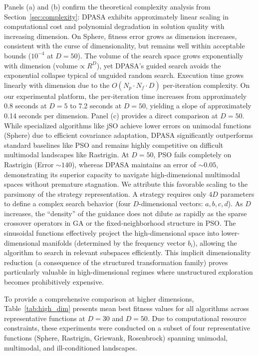 \documentclass[11pt]{article}
\begin{document}
Panels (a) and (b) confirm the theoretical complexity analysis from Section~\ref{sec:complexity}: DPASA exhibits approximately linear scaling in computational cost and polynomial degradation in solution quality with increasing dimension. On Sphere, fitness error grows as dimension increases, consistent with the curse of dimensionality, but remains well within acceptable bounds ($10^{-4}$ at $D=50$). The volume of the search space grows exponentially with dimension ($\text{volume} \propto R^D$), yet DPASA's guided search avoids the exponential collapse typical of unguided random search.
Execution time grows linearly with dimension due to the $O(N_p \cdot N_f \cdot D)$ per-iteration complexity. On our experimental platform, the per-iteration time increases from approximately 0.8 seconds at $D=5$ to 7.2 seconds at $D=50$, yielding a slope of approximately 0.14 seconds per dimension.
Panel (c) provides a direct comparison at $D=50$. While specialized algorithms like jSO achieve lower errors on unimodal functions (Sphere) due to efficient covariance adaptation, DPASA significantly outperforms standard baselines like PSO and remains highly competitive on difficult multimodal landscapes like Rastrigin. At $D=50$, PSO fails completely on Rastrigin (Error $\sim 140$), whereas DPASA maintains an error of $\sim 0.05$, demonstrating its superior capacity to navigate high-dimensional multimodal spaces without premature stagnation.
We attribute this favorable scaling to the parsimony of the strategy representation. A strategy requires only $4D$ parameters to define a complex search behavior (four $D$-dimensional vectors: $a, b, c, d$). As $D$ increases, the ``density'' of the guidance does not dilute as rapidly as the sparse crossover operators in GA or the fixed-neighborhood structure in PSO. The sinusoidal functions effectively project the high-dimensional space into lower-dimensional manifolds (determined by the frequency vector $b_i$), allowing the algorithm to search in relevant subspaces efficiently. This implicit dimensionality reduction (a consequence of the structured transformation family) proves particularly valuable in high-dimensional regimes where unstructured exploration becomes prohibitively expensive.

To provide a comprehensive comparison at higher dimensions, Table~\ref{tab:high_dim} presents mean best fitness values for all algorithms across representative functions at $D=30$ and $D=50$. Due to computational resource constraints, these experiments were conducted on a subset of four representative functions (Sphere, Rastrigin, Griewank, Rosenbrock) spanning unimodal, multimodal, and ill-conditioned landscapes.
\end{document}
